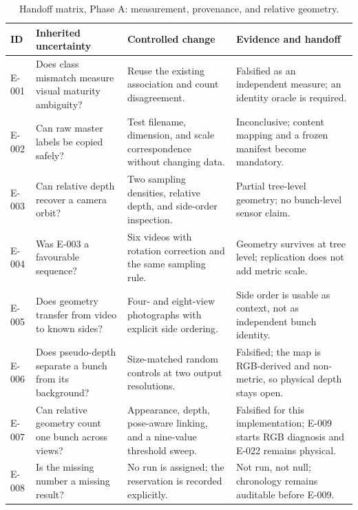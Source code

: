 \begin{table}[t]
\centering\footnotesize
\caption{Handoff matrix, Phase A: measurement, provenance, and relative geometry.}
\begin{tabularx}{\textwidth}{L{0.07\textwidth}L{0.24\textwidth}Y Y}
\toprule
\textbf{ID} & \textbf{Inherited uncertainty} & \textbf{Controlled change} & \textbf{Evidence and handoff}\\
\midrule
E-001 & Does class mismatch measure visual maturity ambiguity? & Reuse the existing association and count disagreement. & Falsified as an independent measure; an identity oracle is required.\\
E-002 & Can raw master labels be copied safely? & Test filename, dimension, and scale correspondence without changing data. & Inconclusive; content mapping and a frozen manifest become mandatory.\\
E-003 & Can relative depth recover a camera orbit? & Two sampling densities, relative depth, and side-order inspection. & Partial tree-level geometry; no bunch-level sensor claim.\\
E-004 & Was E-003 a favourable sequence? & Six videos with rotation correction and the same sampling rule. & Geometry survives at tree level; replication does not add metric scale.\\
E-005 & Does geometry transfer from video to known sides? & Four- and eight-view photographs with explicit side ordering. & Side order is usable as context, not as independent bunch identity.\\
E-006 & Does pseudo-depth separate a bunch from its background? & Size-matched random controls at two output resolutions. & Falsified; the map is RGB-derived and non-metric, so physical depth stays open.\\
E-007 & Can relative geometry count one bunch across views? & Appearance, depth, pose-aware linking, and a nine-value threshold sweep. & Falsified for this implementation; E-009 starts RGB diagnosis and E-022 remains physical.\\
E-008 & Is the missing number a missing result? & No run is assigned; the reservation is recorded explicitly. & Not run, not null; chronology remains auditable before E-009.\\
\bottomrule
\end{tabularx}
\end{table}


